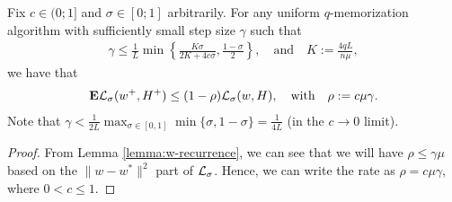 \begin{lemma}
\label{lemma:lyapunov-appendix}
Fix $c \in (0;1]$ and $\sigma \in [0;1]$ arbitrarily. For any uniform $q$-memorization algorithm with sufficiently small step size $\gamma$ such that
\begin{align*}
\gamma \le \frac{1}{L} \min \left\{\frac{K\sigma }{2K + 4c\sigma}, \frac{1-\sigma}{2} \right\}, \quad 
\text{and} \quad K:=  \frac{4qL}{n \mu},
\end{align*}
we have that
\begin{align}
{\mathbf E} {\mathcal L}_\sigma(w^+,H^+)  \le (1-\rho) {\mathcal L}_\sigma(w,H),\quad \text{with} \quad \rho := c \mu \gamma.
\end{align}
Note that $\gamma < \frac 1{2L} \max_{\sigma \in [0,1]} \min\{ \sigma ,  1-\sigma\} = \frac{1}{4L}$ (in the $c \to 0$ limit).
\begin{proof}
From Lemma \ref{lemma:w-recurrence}, we can see that we will have $\rho \leq \gamma \mu$ based on the $ \| w - w^*\|^2$ part of ${\mathcal L}_\sigma$. Hence, we can write the rate as $\rho = c \mu \gamma$, where  $0 < c \leq 1$. 


\end{proof}
\end{lemma}
